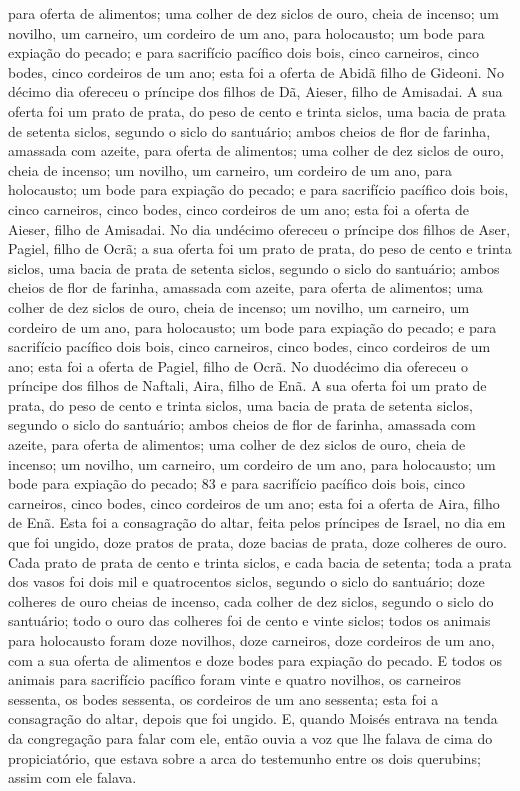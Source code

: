 para oferta de alimentos; uma colher de dez siclos de ouro,
cheia de incenso; um novilho, um carneiro, um cordeiro de um
ano, para holocausto; um bode para expiação do pecado;
e para sacrifício pacífico dois bois, cinco carneiros, cinco
bodes, cinco cordeiros de um ano; esta foi a oferta de Abidã filho
de Gideoni. No décimo dia ofereceu o príncipe dos filhos de
Dã, Aieser, filho de Amisadai. A sua oferta foi um prato de
prata, do peso de cento e trinta siclos, uma bacia de prata de
setenta siclos, segundo o siclo do santuário; ambos cheios de flor
de farinha, amassada com azeite, para oferta de alimentos;
uma colher de dez siclos de ouro, cheia de incenso; um
novilho, um carneiro, um cordeiro de um ano, para holocausto;
um bode para expiação do pecado; e para sacrifício
pacífico dois bois, cinco carneiros, cinco bodes, cinco cordeiros de
um ano; esta foi a oferta de Aieser, filho de Amisadai. No
dia undécimo ofereceu o príncipe dos filhos de Aser, Pagiel, filho
de Ocrã; a sua oferta foi um prato de prata, do peso de cento
e trinta siclos, uma bacia de prata de setenta siclos, segundo o
siclo do santuário; ambos cheios de flor de farinha, amassada com
azeite, para oferta de alimentos; uma colher de dez siclos de
ouro, cheia de incenso; um novilho, um carneiro, um cordeiro
de um ano, para holocausto; um bode para expiação do pecado;
e para sacrifício pacífico dois bois, cinco carneiros, cinco
bodes, cinco cordeiros de um ano; esta foi a oferta de Pagiel, filho
de Ocrã. No duodécimo dia ofereceu o príncipe dos filhos de
Naftali, Aira, filho de Enã. A sua oferta foi um prato de
prata, do peso de cento e trinta siclos, uma bacia de prata de
setenta siclos, segundo o siclo do santuário; ambos cheios de flor
de farinha, amassada com azeite, para oferta de alimentos;
uma colher de dez siclos de ouro, cheia de incenso; um
novilho, um carneiro, um cordeiro de um ano, para holocausto;
um bode para expiação do pecado; 83 e para sacrifício
pacífico dois bois, cinco carneiros, cinco bodes, cinco cordeiros de
um ano; esta foi a oferta de Aira, filho de Enã. Esta foi a
consagração do altar, feita pelos príncipes de Israel, no dia em que
foi ungido, doze pratos de prata, doze bacias de prata, doze
colheres de ouro. Cada prato de prata de cento e trinta
siclos, e cada bacia de setenta; toda a prata dos vasos foi dois mil
e quatrocentos siclos, segundo o siclo do santuário; doze
colheres de ouro cheias de incenso, cada colher de dez siclos,
segundo o siclo do santuário; todo o ouro das colheres foi de cento
e vinte siclos; todos os animais para holocausto foram doze
novilhos, doze carneiros, doze cordeiros de um ano, com a sua oferta
de alimentos e doze bodes para expiação do pecado. E todos os
animais para sacrifício pacífico foram vinte e quatro novilhos, os
carneiros sessenta, os bodes sessenta, os cordeiros de um ano
sessenta; esta foi a consagração do altar, depois que foi ungido.
E, quando Moisés entrava na tenda da congregação para falar
com ele, então ouvia a voz que lhe falava de cima do propiciatório,
que estava sobre a arca do testemunho entre os dois querubins; assim
com ele falava.

